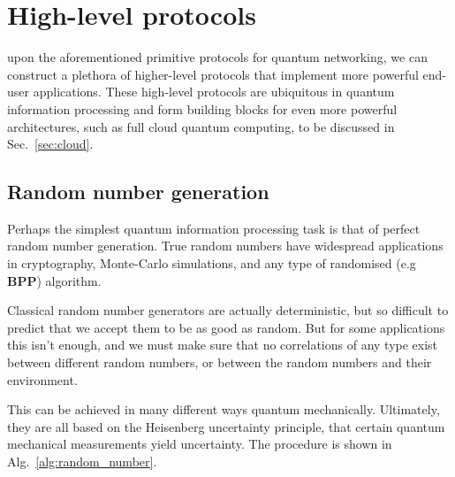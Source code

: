 %
%

\section{High-level protocols} 

 upon the aforementioned primitive protocols for quantum networking, we can construct a plethora of higher-level protocols that implement more powerful end-user applications. These high-level protocols are ubiquitous in quantum information processing and form building blocks for even more powerful architectures, such as full cloud quantum computing, to be discussed in Sec.~\ref{sec:cloud}.

%
%

\subsection{Random number generation} 

Perhaps the simplest quantum information processing task is that of perfect random number generation. True random numbers have widespread applications in cryptography, Monte-Carlo simulations, and any type of randomised (e.g \textbf{BPP}) algorithm.

Classical random number generators are actually deterministic, but so difficult to predict that we accept them to be as good as random. But for some applications this isn't enough, and we must make sure that no correlations of any type exist between different random numbers, or between the random numbers and their environment.

This can be achieved in many different ways quantum mechanically. Ultimately, they are all based on the Heisenberg uncertainty principle, that certain quantum mechanical measurements yield uncertainty. The procedure is shown in Alg.~\ref{alg:random_number}.

